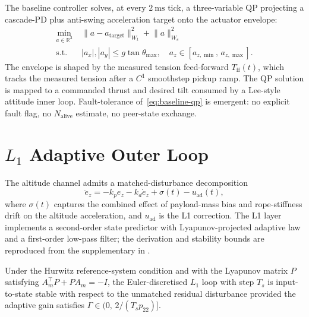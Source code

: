 \documentclass[journal,twocolumn,10pt]{IEEEtran}
\begin{document}
The baseline controller solves, at every $2~\si{\milli\second}$ tick,
a three-variable QP projecting a cascade-PD plus anti-swing
acceleration target onto the actuator envelope:
\begin{equation}
\begin{aligned}
\min_{a\in\mathbb R^3}\;& \lVert a - a_\text{target}\rVert_{W_t}^2
                      + \lVert a\rVert_{W_e}^2 \\
\text{s.t.}\;& |a_x|,|a_y|\le g\tan\theta_{\max},\quad
              a_z\in[a_{z,\min},\,a_{z,\max}].
\end{aligned}
\label{eq:baseline-qp}
\end{equation}
The envelope is shaped by the measured tension feed-forward
$T_\text{ff}(t)$, which tracks the measured tension after a $C^1$
smoothstep pickup ramp. The QP solution is mapped to a commanded
thrust and desired tilt consumed by a Lee-style attitude inner loop.
Fault-tolerance of~\eqref{eq:baseline-qp} is emergent: no explicit
fault flag, no $N_\text{alive}$ estimate, no peer-state exchange.

\section{$L_1$ Adaptive Outer Loop}
\label{sec:l1}

The altitude channel admits a matched-disturbance decomposition
\begin{equation}
\ddot e_z = -k_p e_z - k_d \dot e_z + \sigma(t) - u_\text{ad}(t),
\label{eq:l1-channel}
\end{equation}
where $\sigma(t)$ captures the combined effect of payload-mass bias
and rope-stiffness drift on the altitude acceleration, and
$u_\text{ad}$ is the L1 correction. The L1 layer implements a
second-order state predictor with Lyapunov-projected adaptive law
and a first-order low-pass filter; the derivation and stability
bounds are reproduced from the supplementary in
.

\begin{theorem}\label{thm:l1}
Under the Hurwitz reference-system condition and with the
Lyapunov matrix $P$ satisfying
$A_m^\top P + P A_m = -I$, the Euler-discretised $L_1$ loop with
step $T_s$ is input-to-state stable with respect to the unmatched
residual disturbance provided the adaptive gain satisfies
$\Gamma \in (0,\,2/(T_s p_{22})]$.
\end{theorem}
\end{document}
